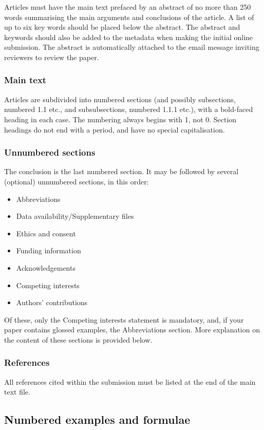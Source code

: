 \documentclass[charis,linguex,biblatex]{glossa}
\begin{document}
Articles must have the main text prefaced by an abstract of no more than 250 words summarising the main arguments and conclusions of the article. A list of up to six key words should be placed below the abstract. The abstract and keywords should also be added to the metadata when making the initial online submission. The abstract is automatically attached to the email message inviting reviewers to review the paper.

\subsubsection{Main text}

Articles are subdivided into numbered sections (and possibly subsections, numbered 1.1 etc., and subsubsections, numbered 1.1.1 etc.), with a bold-faced heading in each case. The numbering always begins with 1, not 0. Section headings do not end with a period, and have no special capitalisation.

\subsubsection{Unnumbered sections}
The conclusion is the last numbered section. It may be followed by several (optional) unnumbered sections, in this order: 
\begin{itemize}
\item Abbreviations
\item Data availability/Supplementary files
\item Ethics and consent
\item Funding information
\item Acknowledgements
\item Competing interests
\item Authors' contributions
\end{itemize}

\noindent Of these, only the Competing interests statement is mandatory, and, if your paper contains glossed examples, the Abbreviations section. More explanation on the content of these sections is provided below.

\subsubsection{References}
All references cited within the submission must be listed at the end of the main text file.

\subsection{Numbered examples and formulae}
\end{document}
